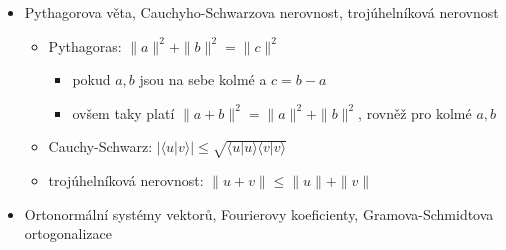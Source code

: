 \begin{itemize}
\begin{itemize}
\begin{itemize}
\item je-li $V$ prostor se skalárním součinem, pak norma odvozená ze skalárního součinu je zobrazení $V\to R^+_0$ přiřazující vektoru $u$ jeho normu $\|u\|=\sqrt{\langle u|u\rangle}$
\item geometrická interpretace v euklidovském prostoru $\mathbb R^n$
\begin{itemize}
\item $\|u\|$ \dots{} délka (velikost) $u$
\item $\|u-v\|$ \dots{} vzdálenost bodů $u,v$
\item $\langle u|v\rangle$ souvisí s \quotedblbase{}úhlem\textquotedblleft{} $\varphi$ mezi $u,v$ a délkami $u,v$
\begin{itemize}
\item $\langle u|v\rangle=\|u\|\cdot\|v\|\cos\varphi$
\item to vyplývá z kosinové věty, kde $a=\|u\|,\,b=\|v\|,\,c=\|u-v\|$
\end{itemize}
\end{itemize}
\end{itemize}
\item kolmé vektory
\begin{itemize}
\item vektory $u,v$ z prostoru se skalárním součinem jsou kolmé (ortogonální), pokud $\langle u|v\rangle=0$
\item kolmé vektory značíme $u\perp v$
\end{itemize}
\end{itemize}
\item Pythagorova věta, Cauchyho-Schwarzova nerovnost, trojúhelníková nerovnost
\begin{itemize}
\item Pythagoras: $\|a\|^2+\|b\|^2=\|c\|^2$
\begin{itemize}
\item pokud $a,b$ jsou na sebe kolmé a $c=b-a$
\item ovšem taky platí $\|a+b\|^2=\|a\|^2+\|b\|^2$, rovněž pro kolmé $a,b$
\end{itemize}
\item Cauchy-Schwarz: $|\langle u|v\rangle|\leq\sqrt{\langle u|u\rangle\langle v|v\rangle}$
\item trojúhelníková nerovnost: $\|u+v\|\leq\|u\|+\|v\|$
\end{itemize}
\item Ortonormální systémy vektorů, Fourierovy koeficienty, Gramova-Schmidtova ortogonalizace
\begin{itemize}

\end{itemize}
\end{itemize}
